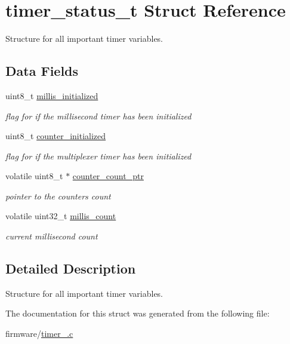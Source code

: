 \hypertarget{structtimer__status__t}{}\section{timer\+\_\+status\+\_\+t Struct Reference}
\label{structtimer__status__t}


Structure for all important timer variables.  


\subsection*{Data Fields}
\begin{DoxyCompactItemize}
\item 
\hypertarget{structtimer__status__t_aac960de8872f02d6029e699d31222d05}{}\label{structtimer__status__t_aac960de8872f02d6029e699d31222d05} 
uint8\+\_\+t \hyperlink{structtimer__status__t_aac960de8872f02d6029e699d31222d05}{millis\+\_\+initialized}
\begin{DoxyCompactList}\small\item\em flag for if the millisecond timer has been initialized \end{DoxyCompactList}\item 
\hypertarget{structtimer__status__t_a412a83225f55d10c152f11d229d1e7c9}{}\label{structtimer__status__t_a412a83225f55d10c152f11d229d1e7c9} 
uint8\+\_\+t \hyperlink{structtimer__status__t_a412a83225f55d10c152f11d229d1e7c9}{counter\+\_\+initialized}
\begin{DoxyCompactList}\small\item\em flag for if the multiplexer timer has been initialized \end{DoxyCompactList}\item 
\hypertarget{structtimer__status__t_ae68a2c3097964829935598782c4c0e9d}{}\label{structtimer__status__t_ae68a2c3097964829935598782c4c0e9d} 
volatile uint8\+\_\+t $\ast$ \hyperlink{structtimer__status__t_ae68a2c3097964829935598782c4c0e9d}{counter\+\_\+count\+\_\+ptr}
\begin{DoxyCompactList}\small\item\em pointer to the counter\textquotesingle{}s count \end{DoxyCompactList}\item 
\hypertarget{structtimer__status__t_a81d123c1735d21d3286d84ab40eae5c7}{}\label{structtimer__status__t_a81d123c1735d21d3286d84ab40eae5c7} 
volatile uint32\+\_\+t \hyperlink{structtimer__status__t_a81d123c1735d21d3286d84ab40eae5c7}{millis\+\_\+count}
\begin{DoxyCompactList}\small\item\em current millisecond count \end{DoxyCompactList}\end{DoxyCompactItemize}


\subsection{Detailed Description}
Structure for all important timer variables. 

The documentation for this struct was generated from the following file\+:\begin{DoxyCompactItemize}
\item 
firmware/\hyperlink{timer__4313_8c}{timer\+\_.\+c}\end{DoxyCompactItemize}

